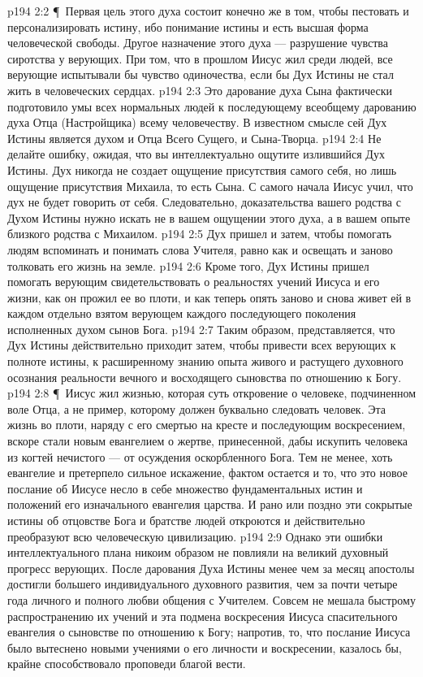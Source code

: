 \vs p194 2:2 \P\ Первая цель этого духа состоит конечно же в том, чтобы пестовать и персонализировать истину, ибо понимание истины и есть высшая форма человеческой свободы. Другое назначение этого духа --- разрушение чувства сиротства у верующих. При том, что в прошлом Иисус жил среди людей, все верующие испытывали бы чувство одиночества, если бы Дух Истины не стал жить в человеческих сердцах.
\vs p194 2:3 Это дарование духа Сына фактически подготовило умы всех нормальных людей к последующему всеобщему дарованию духа Отца (Настройщика) всему человечеству. В известном смысле сей Дух Истины является духом и Отца Всего Сущего, и Сына\hyp{}Творца.
\vs p194 2:4 Не делайте ошибку, ожидая, что вы интеллектуально ощутите излившийся Дух Истины. Дух никогда не создает ощущение присутствия самого себя, но лишь ощущение присутствия Михаила, то есть Сына. С самого начала Иисус учил, что дух не будет говорить от себя. Следовательно, доказательства вашего родства с Духом Истины нужно искать не в вашем ощущении этого духа, а в вашем опыте близкого родства с Михаилом.
\vs p194 2:5 Дух пришел и затем, чтобы помогать людям вспоминать и понимать слова Учителя, равно как и освещать и заново толковать его жизнь на земле.
\vs p194 2:6 Кроме того, Дух Истины пришел помогать верующим свидетельствовать о реальностях учений Иисуса и его жизни, как он прожил ее во плоти, и как теперь опять заново и снова живет ей в каждом отдельно взятом верующем каждого последующего поколения исполненных духом сынов Бога.
\vs p194 2:7 Таким образом, представляется, что Дух Истины действительно приходит затем, чтобы привести всех верующих к полноте истины, к расширенному знанию опыта живого и растущего духовного осознания реальности вечного и восходящего сыновства по отношению к Богу.
\vs p194 2:8 \P\ Иисус жил жизнью, которая суть откровение о человеке, подчиненном воле Отца, а не пример, которому должен буквально следовать человек. Эта жизнь во плоти, наряду с его смертью на кресте и последующим воскресением, вскоре стали новым евангелием о жертве, принесенной, дабы искупить человека из когтей нечистого --- от осуждения оскорбленного Бога. Тем не менее, хоть евангелие и претерпело сильное искажение, фактом остается и то, что это новое послание об Иисусе несло в себе множество фундаментальных истин и положений его изначального евангелия царства. И рано или поздно эти сокрытые истины об отцовстве Бога и братстве людей откроются и действительно преобразуют всю человеческую цивилизацию.
\vs p194 2:9 Однако эти ошибки интеллектуального плана никоим образом не повлияли на великий духовный прогресс верующих. После дарования Духа Истины менее чем за месяц апостолы достигли большего индивидуального духовного развития, чем за почти четыре года личного и полного любви общения с Учителем. Совсем не мешала быстрому распространению их учений и эта подмена  воскресения Иисуса  спасительного евангелия о сыновстве по отношению к Богу; напротив, то, что послание Иисуса было вытеснено новыми учениями о его личности и воскресении, казалось бы, крайне способствовало проповеди благой вести.
